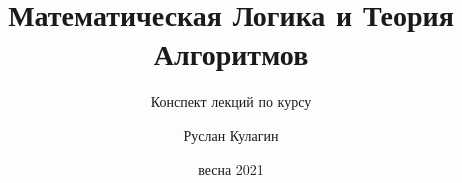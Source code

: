 \documentclass[
	fontsize=10pt, %
	twoside=false, %
	numbers=noenddot, %
]{kaobook}
\begin{document}


\title{Математическая Логика и Теория Алгоритмов}
\subtitle{Конспект лекций по курсу}

\author[Ruslan Kulagin]{Руслан Кулагин}

\date{весна 2021}



\frontmatter %




\makeatletter
\uppertitleback{\@titlehead} %
\end{document}
